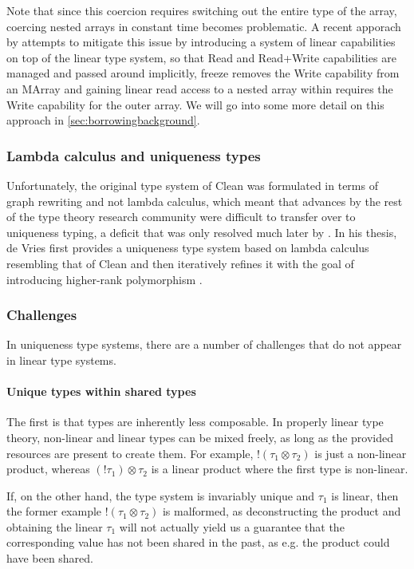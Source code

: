 Note that since this coercion requires switching out the entire type of the array, coercing nested arrays in constant time becomes problematic. A recent apporach by \cite{spiwack_linearly_2022} attempts to mitigate this issue by introducing a system of linear capabilities on top of the linear type system, so that Read and Read+Write capabilities are managed and passed around implicitly, freeze removes the Write capability from an MArray and gaining linear read access to a nested array within requires the Write capability for the outer array. We will go into some more detail on this approach in \cref{sec:borrowingbackground}.

\subsubsection{Lambda calculus and uniqueness types}
Unfortunately, the original type system of Clean was formulated in terms of graph rewriting and not lambda calculus, which meant that advances by the rest of the type theory research community were difficult to transfer over to uniqueness typing, a deficit that was only resolved much later by \cite{de_vries_making_2009}. In his thesis, de Vries first provides a uniqueness type system based on lambda calculus resembling that of Clean and then iteratively refines it with the goal of introducing higher-rank polymorphism \citep{peyton_jones_practical_2007}.

\subsubsection{Challenges}
In uniqueness type systems, there are a number of challenges that do not appear in linear type systems. 

\paragraph{Unique types within shared types} The first is that types are inherently less composable. In properly linear type theory, non-linear and linear types can be mixed freely, as long as the provided resources are present to create them. For example, $!(\tau_1 \otimes \tau_2)$ is just a non-linear product, whereas $(!\tau_1) \otimes \tau_2$ is a linear product where the first type is non-linear. 

If, on the other hand, the type system is invariably unique and $\tau_1$ is linear, then the former example $!(\tau_1 \otimes \tau_2)$ is malformed, as deconstructing the product and obtaining the linear $\tau_1$ will not actually yield us a guarantee that the corresponding value has not been shared in the past, as e.g. the product could have been shared. 

